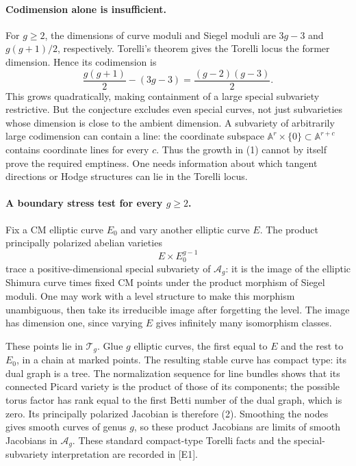\documentclass[11pt]{article}
\begin{document}
\paragraph{Codimension alone is insufficient.}
For $g\ge2$, the dimensions of curve moduli and Siegel moduli are
$3g-3$ and $g(g+1)/2$, respectively. Torelli's theorem gives the
Torelli locus the former dimension. Hence its codimension is
\[
 \frac{g(g+1)}2-(3g-3)=\frac{(g-2)(g-3)}2.            \tag{1}
\]
This grows quadratically, making containment of a large special
subvariety restrictive. But the conjecture excludes even special
curves, not just subvarieties whose dimension is close to the ambient
dimension. A subvariety of arbitrarily large codimension can contain
a line: the coordinate subspace
$\mathbb A^r\times\{0\}\subset\mathbb A^{r+c}$ contains coordinate
lines for every $c$. Thus the growth in (1) cannot by itself prove
the required emptiness. One needs information about which tangent
directions or Hodge structures can lie in the Torelli locus.

\paragraph{A boundary stress test for every $g\ge2$.}
Fix a CM elliptic curve $E_0$ and vary another elliptic curve $E$.
The product principally polarized abelian varieties
\[
 E\times E_0^{g-1}                                    \tag{2}
\]
trace a positive-dimensional special subvariety of $\mathcal A_g$:
it is the image of the elliptic Shimura curve times fixed CM points
under the product morphism of Siegel moduli. One may work with a
level structure to make this morphism unambiguous, then take its
irreducible image after forgetting the level. The image has dimension
one, since varying $E$ gives infinitely many isomorphism classes.

These points lie in $\mathcal T_g$. Glue $g$ elliptic curves, the first
equal to $E$ and the rest to $E_0$, in a chain at marked points.
The resulting stable curve has compact type: its dual graph is a
tree. The normalization sequence for line bundles shows that its
connected Picard variety is the product of those of its components;
the possible torus factor has rank equal to the first Betti number
of the dual graph, which is zero. Its principally polarized Jacobian
is therefore (2). Smoothing the nodes gives smooth curves of genus
$g$, so these product Jacobians are limits of smooth Jacobians in
$\mathcal A_g$. These standard compact-type Torelli facts and the
special-subvariety interpretation are recorded in [E1].
\end{document}
